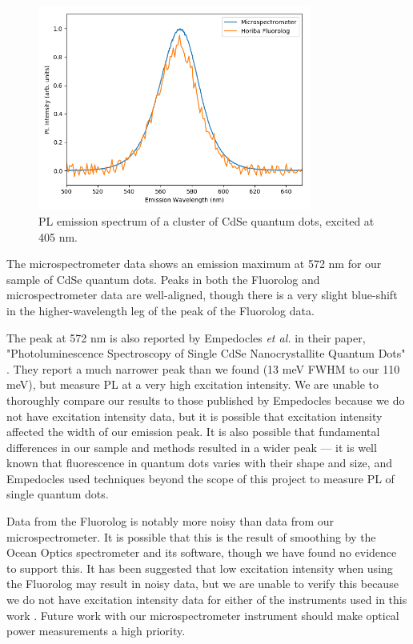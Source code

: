 \begin{figure}[H]
    \centering
    \includegraphics[width=0.8\textwidth]{./img/qd-2.png}
    \caption{PL emission spectrum of a cluster of CdSe quantum dots, excited at 405 nm.}
    \label{fig:pl-adt-qd}
\end{figure}

The microspectrometer data shows an emission maximum at 572 nm for our sample of CdSe quantum dots. Peaks in both the Fluorolog and microspectrometer data are well-aligned, though there is a very slight blue-shift in the higher-wavelength leg of the peak of the Fluorolog data. 

The peak at 572 nm is also reported by Empedocles \emph{et al.} in their paper, "Photoluminescence Spectroscopy of Single CdSe Nanocrystallite Quantum Dots" \cite{empedocles_photoluminescence_1996}. They report a much narrower peak than we found (13 meV FWHM to our 110 meV), but measure PL at a very high excitation intensity. We are unable to thoroughly compare our results to those published by Empedocles because we do not have excitation intensity data, but it is possible that excitation intensity affected the width of our emission peak. It is also possible that fundamental differences in our sample and methods resulted in a wider peak --- it is well known that fluorescence in quantum dots varies with their shape and size, and Empedocles used techniques beyond the scope of this project to measure PL of single quantum dots.

Data from the Fluorolog is notably more noisy than data from our microspectrometer. It is possible that this is the result of smoothing by the Ocean Optics spectrometer and its software, though we have found no evidence to support this. It has been suggested that low excitation intensity when using the Fluorolog may result in noisy data, but we are unable to verify this because we do not have excitation intensity data for either of the instruments used in this work \cite{minot-private}. Future work with our microspectrometer instrument should make optical power measurements a high priority.
